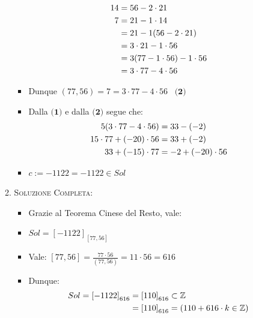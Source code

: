 \documentclass[10pt]{article}
\begin{document}
\begin{itemize}
\begin{enumerate}
\begin{itemize}
\begin{equation}
\begin{split}
	14 &= 56 - 2 \cdot 21 \\
	7 &= 21 - 1 \cdot 14 \\
	&= 21 - 1 (56 - 2 \cdot 21) \\
	&= 3 \cdot 21 - 1 \cdot 56 \\
	&= 3 (77 - 1 \cdot 56) - 1 \cdot 56 \\
	&= 3 \cdot 77 - 4 \cdot 56
	\notag
	\end{split}
	\end{equation}
	\item
	Dunque $(77, 56) = 7 = 3 \cdot 77 - 4 \cdot 56$ $\,\,\,\textbf{(2)}$
	\item
	Dalla $\textbf{(1)}$ e dalla $\textbf{(2)}$ segue che:
	\begin{equation}
	\begin{split}
	5(3 \cdot 77 - 4 \cdot 56) &= 33 - (-2) \\
	15 \cdot 77 + (-20) \cdot 56 &= 33 + (-2) \\
	33 + (-15) \cdot 77 &= -2 + (-20) \cdot 56 
	\notag
	\end{split}
	\end{equation}
	\item
	$c := -1122 = -1122 \in Sol$
	\end{itemize}
	\newpage
	\item
	\textsc{Soluzione Completa}:
	\begin{itemize}
	\item
	Grazie al Teorema Cinese del Resto, vale:
	\item
	$Sol = \left[-1122\right]_{\left[77,56 \right]}$ \smallskip
	\item
	Vale: $\displaystyle{\left[77,56 \right] = \frac{77 \cdot 56}{(77,56)} = 11 \cdot 56 = 616}$ 
	\item
	Dunque:
	\begin{equation}
	\begin{split}
	Sol = \left[-1122\right]_{616} &= \left[110\right]_{616} \subset \mathbb{Z} \\
	&=  \left[110\right]_{616} = \left(110 + 616 \cdot k \in \mathbb{Z}\right)
	\notag
	\end{split}
	\end{equation}
	\end{itemize}
	\end{enumerate}
	\end{itemize}
	
\end{document}
